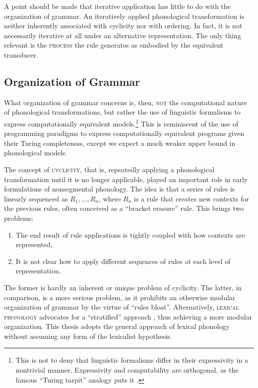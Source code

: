 \documentclass[12pt, a4paper]{report}
\newcommand{\textemph}[1]{\textsc{#1}}
\newcommand{\textterm}[1]{\textsc{#1}\index{#1}}
\begin{document}
A point should be made that iterative application has little to do
with the organization of grammar.  An iteratively applied phonological
transformation is neither inherently associated with cyclicity nor
with ordering.  In fact, it is not necessarily iterative at all under
an alternative representation.  The only thing relevant is the
\textemph{process} the rule generates as embodied by the equivalent
transducer.

\subsection{Organization of Grammar}
What organization of grammar concerns is, then, \textemph{not} the
computational nature of phonological transformations, but rather the
use of linguistic formalisms to express computationally equivalent
models.\footnote{This is not to deny that linguistic formalisms differ
  in their expressivity in a nontrivial manner.  Expressivity and
  computability are orthogonal, as the famous \enquote{Turing tarpit}
  analogy puts it \parencite{p82ep}.}  This is reminiscent of the use
of programming paradigms to express computationally equivalent
programs given their Turing completeness, except we expect a much
weaker upper bound in phonological models.

The concept of \textterm{cyclicity}, that is, repeatedly applying a
phonological transformation until it is no longer applicable, played
an important role in early formulations of nonsegmental phonology.
The idea is that a series of rules is linearly sequenced as
\(R_{1}, \ldots, R_{n}\), where \(R_{n}\) is a rule that creates new
contexts for the previous rules, often conceived as a \enquote{bracket
  erasure} rule.  This brings two problems:
%
\begin{enumerate}
\item The end result of rule applications is tightly coupled with how
  contexts are represented;
\item It is not clear how to apply different sequences of rules at
  each level of representation.
\end{enumerate}
%
The former is hardly an inherent or unique problem of cyclicity.  The
latter, in comparison, is a more serious problem, as it prohibits an
otherwise modular organization of grammar by the virtue of
\enquote{rules bloat}.  Alternatively, \textterm{lexical phonology}
advocates for a \enquote{stratified} approach \parencite{k82cplp},
thus achieving a more modular organization.  This thesis adopts the
general approach of lexical phonology without assuming any form of the
lexicalist hypothesis.
\end{document}
